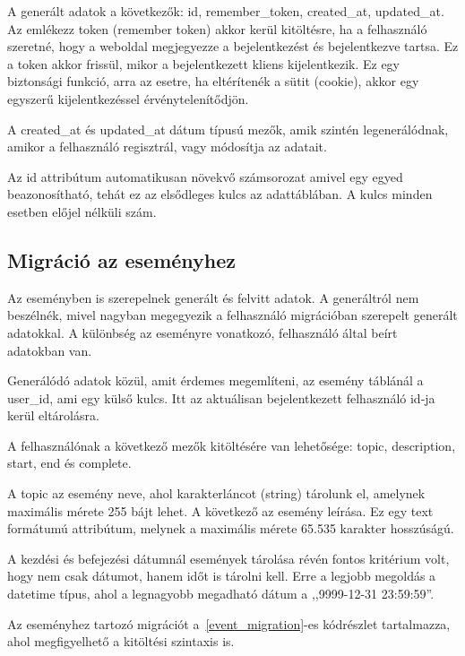 \documentclass[
]{thesis-ekf}
\theoremstyle{definition}
\theoremstyle{remark}
\begin{document}
	A generált adatok a következők: id, remember\_token, created\_at, updated\_at. Az emlékezz token (remember token) akkor kerül kitöltésre, ha a felhasználó szeretné, hogy a weboldal megjegyezze a bejelentkezést és bejelentkezve tartsa. Ez a token akkor frissül, mikor a bejelentkezett kliens kijelentkezik. Ez egy biztonsági funkció, arra az esetre, ha eltérítenék a sütit (cookie), akkor egy egyszerű kijelentkezéssel érvénytelenítődjön. 
	
	A created\_at és updated\_at dátum típusú mezők, amik szintén legenerálódnak, amikor a felhasználó regisztrál, vagy módosítja az adatait. 
	
	Az id attribútum automatikusan növekvő számsorozat amivel egy egyed beazonosítható, tehát ez az elsődleges kulcs az adattáblában.  A kulcs minden esetben előjel nélküli szám.
	
	\subsection{Migráció az eseményhez}
	Az eseményben is szerepelnek generált és felvitt adatok. A generáltról nem beszélnék, mivel nagyban megegyezik a felhasználó migrációban szerepelt generált adatokkal. A különbség az eseményre vonatkozó, felhasználó által beírt adatokban van. 
	
	Generálódó adatok közül, amit érdemes megemlíteni, az esemény táblánál a user\_id, ami egy külső kulcs. Itt az aktuálisan bejelentkezett felhasználó id-ja kerül eltárolásra. 
	
	A felhasználónak a következő mezők kitöltésére van lehetősége: topic, description, start, end és complete. 
	
	A topic az esemény neve, ahol karakterláncot (string) tárolunk el, amelynek maximális mérete 255 bájt lehet. A következő az esemény leírása. Ez egy text formátumú attribútum, melynek a maximális mérete 65.535 karakter hosszúságú.
	
	A kezdési és befejezési dátumnál események tárolása révén fontos kritérium volt, hogy nem csak dátumot, hanem időt is tárolni kell. Erre a legjobb megoldás a datetime típus, ahol a legnagyobb megadható dátum a ,,9999-12-31 23:59:59''.
	
	Az eseményhez tartozó migrációt a~\ref{event_migration}-es kódrészlet tartalmazza, ahol megfigyelhető a kitöltési szintaxis is. 
	
	
	
\end{document}
